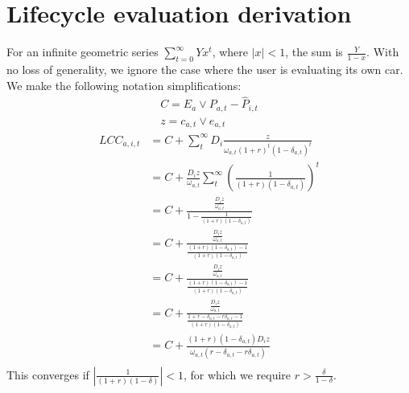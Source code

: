 \documentclass[12pt]{article}
\begin{document}
	\section{Lifecycle evaluation derivation}\label{Appendix_Lifecycle_Derivation} 
	For an infinite geometric series $\sum_{t=0}^\infty Yx^t$, where $|x| < 1$, the sum is $\frac{Y}{1-x}$. With no loss of generality, we ignore the case where the user is evaluating its own car. We make the following notation simplifications:
	\begin{align}
		C = E_{a} \vee P_{a,t}-\hat{P}_{i,t}\\
		z = c_{a,t} \vee e_{a,t}
	\end{align}
	\begin{align}
		LCC_{a,i,t} &= C + \sum_{t}^\infty D_i \frac{z}{\omega_{a,t}(1+r)^t(1-\delta_{a,t})^t}\\
		&=C + \frac{D_iz}{\omega_{a,t}}\sum_{t}^\infty  \left(\frac{1}{(1+r)(1-\delta_{a,t})}\right)^t\\
		&=C + \frac{\frac{D_iz}{\omega_{a,t}}}{1-\frac{1}{(1+r)(1-\delta_{a,t})}}\\
		&=C + \frac{\frac{D_iz}{\omega_{a,t}}}{\frac{(1+r)(1-\delta_{a,t})-1}{(1+r)(1-\delta_{a,t})}}\\
		&=C + \frac{\frac{D_iz}{\omega_{a,t}}}{\frac{(1+r)(1-\delta_{a,t})-1}{(1+r)(1-\delta_{a,t})}}\\
		&=C + \frac{\frac{D_iz}{\omega_{a,t}}}{\frac{1+r-\delta_{a,t}-r\delta_{a,t}-1}{(1+r)(1-\delta_{a,t})}}\\
		&=C + \frac{(1+r)(1-\delta_{a,t})D_iz}{\omega_{a,t}(r-\delta_{a,t}-r\delta_{a,t})}\\
	\end{align}
	This converges if $|\frac{1}{(1+r)(1-\delta)}|<1$, for which we require $r>\frac{\delta}{1-\delta}$.
	
\end{document}
